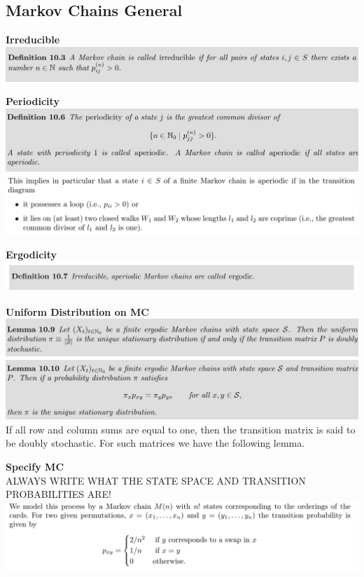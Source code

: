 \documentclass[25pt]{sciposter}
\newenvironment{thm}[1]{\begin{mdframed}[backgroundcolor=pink!20,innertopmargin=15pt, innerbottommargin=15pt, nobreak=true]
		\textbf{#1 }
	}
	{ 
	\end{mdframed}
}
\begin{document}
\begin{multicols}{3}
\section{Markov Chains General}

\textbf{Irreducible}\\
\includegraphics[width=\linewidth]{screenshot011}

\textbf{Periodicity}\\
\includegraphics[width=\linewidth]{screenshot012}
\includegraphics[width=\linewidth]{screenshot013}

\textbf{Ergodicity}\\
\includegraphics[width=\linewidth]{screenshot014}


\textbf{Uniform Distribution on MC}\\
\includegraphics[width=\linewidth]{screenshot015}
\includegraphics[width=\linewidth]{screenshot016}
If all row and column sums are equal to one, then the transition matrix is said to be doubly stochastic. For such matrices we have the following lemma.



\begin{thm}{Specify MC}\\
ALWAYS WRITE WHAT THE STATE SPACE AND TRANSITION PROBABILITIES ARE!\\
\includegraphics[width=1\linewidth]{screenshot020}	
\end{thm}


\end{multicols}
\end{document}
